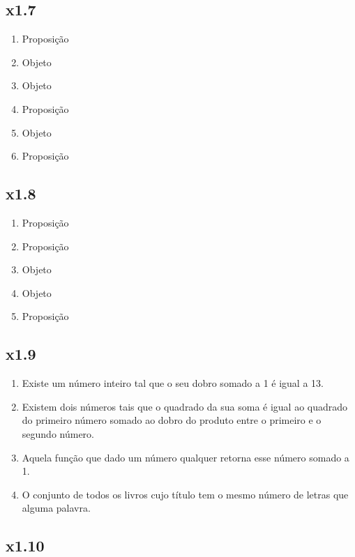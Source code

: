 \documentclass[portuguese,a4paper,12pt]{article}
\begin{document}
	\subsection*{x1.7}
	
	\begin{enumerate}[label=(\alph*)]
		\item Proposição
		\item Objeto
		\item Objeto
		\item Proposição
		\item Objeto
		\item Proposição
	\end{enumerate}
	
	\subsection*{x1.8}
	
	\begin{enumerate}[label=(\arabic*)]
		\item Proposição
		\item Proposição
		\item Objeto
		\item Objeto
		\item Proposição
	\end{enumerate}
	
	\subsection*{x1.9}
	
	\begin{enumerate}[label=(\arabic*)]
		\item Existe um número inteiro tal que o seu dobro somado a 1 é igual a 13.
		\item Existem dois números tais que o quadrado da sua soma é igual ao quadrado do primeiro número somado ao dobro do produto entre o primeiro e o segundo número.
		\item Aquela função que dado um número qualquer retorna esse número somado a 1.
		\item O conjunto de todos os livros cujo título tem o mesmo número de letras que alguma palavra.
	\end{enumerate}
	
	\subsection*{x1.10}
	
\end{document}
